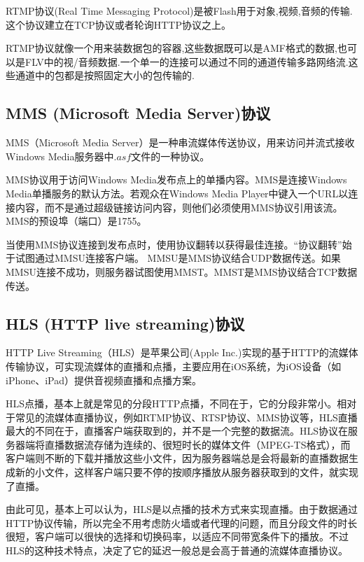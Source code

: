 \documentclass[bachelor]{thesis-uestc}
\begin{document}
\par RTMP协议(Real Time Messaging Protocol)是被Flash用于对象,视频,音频的传输.这个协议建立在TCP协议或者轮询HTTP协议之上。

\par RTMP协议就像一个用来装数据包的容器,这些数据既可以是AMF格式的数据,也可以是FLV中的视/音频数据.一个单一的连接可以通过不同的通道传输多路网络流.这些通道中的包都是按照固定大小的包传输的.


\subsection{MMS (Microsoft Media Server)协议}

\par MMS（Microsoft Media Server）是一种串流媒体传送协议，用来访问并流式接收Windows Media服务器中$.asf$文件的一种协议。

\par MMS协议用于访问Windows Media发布点上的单播内容。MMS是连接Windows Media单播服务的默认方法。若观众在Windows Media Player中键入一个URL以连接内容，而不是通过超级链接访问内容，则他们必须使用MMS协议引用该流。MMS的预设埠（端口）是1755。
\par 当使用MMS协议连接到发布点时，使用协议翻转以获得最佳连接。“协议翻转”始于试图通过MMSU连接客户端。 MMSU是MMS协议结合UDP数据传送。如果MMSU连接不成功，则服务器试图使用MMST。MMST是MMS协议结合TCP数据传送。

\subsection{HLS (HTTP live streaming)协议}
\par HTTP Live Streaming（HLS）是苹果公司(Apple Inc.)实现的基于HTTP的流媒体传输协议，可实现流媒体的直播和点播，主要应用在iOS系统，为iOS设备（如iPhone、iPad）提供音视频直播和点播方案。

\par HLS点播，基本上就是常见的分段HTTP点播，不同在于，它的分段非常小。相对于常见的流媒体直播协议，例如RTMP协议、RTSP协议、MMS协议等，HLS直播最大的不同在于，直播客户端获取到的，并不是一个完整的数据流。HLS协议在服务器端将直播数据流存储为连续的、很短时长的媒体文件（MPEG-TS格式），而客户端则不断的下载并播放这些小文件，因为服务器端总是会将最新的直播数据生成新的小文件，这样客户端只要不停的按顺序播放从服务器获取到的文件，就实现了直播。

\par 由此可见，基本上可以认为，HLS是以点播的技术方式来实现直播。由于数据通过HTTP协议传输，所以完全不用考虑防火墙或者代理的问题，而且分段文件的时长很短，客户端可以很快的选择和切换码率，以适应不同带宽条件下的播放。不过HLS的这种技术特点，决定了它的延迟一般总是会高于普通的流媒体直播协议。 
　
\end{document}
